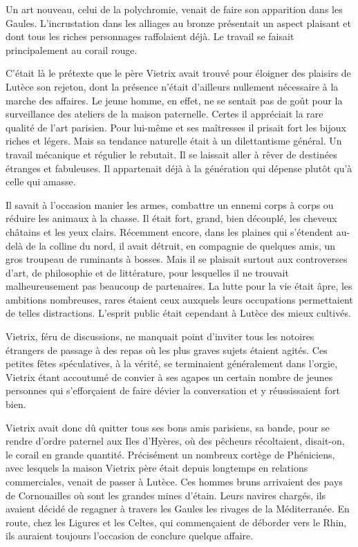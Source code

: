 \documentclass[a4paper, 11pt, oneside, polutonikogreek, french]{article}
\begin{document}
Un art nouveau, celui de la polychromie, venait de faire son apparition dans les Gaules. L'incrustation dans les alliages au bronze présentait un aspect plaisant et dont tous les riches personnages raffolaient déjà. Le travail se faisait principalement au corail rouge.

C'était là le prétexte que le père Vietrix avait trouvé pour éloigner des plaisirs de Lutèce son rejeton, dont la présence n'était d'ailleurs nullement nécessaire à la marche des affaires. Le jeune homme, en effet, ne se sentait pas de goût pour la surveillance des ateliers de la maison paternelle. Certes il appréciait la rare qualité de l'art parisien. Pour lui-même et ses maîtresses il prisait fort les bijoux riches et légers. Mais sa tendance naturelle était à un dilettantisme général. Un travail mécanique et régulier le rebutait. Il se laissait aller à rêver de destinées étranges et fabuleuses. Il appartenait déjà à la génération qui dépense plutôt qu'à celle qui amasse.

Il savait à l'occasion manier les armes, combattre un ennemi corps à corps ou réduire les animaux à la chasse. Il était fort, grand, bien découplé, les cheveux châtains et les yeux clairs. Récemment encore, dans les plaines qui s'étendent au-delà de la colline du nord, il avait détruit, en compagnie de quelques amis, un gros troupeau de ruminants à bosses. Mais il se plaisait surtout aux controverses d'art, de philosophie et de littérature, pour lesquelles il ne trouvait malheureusement pas beaucoup de partenaires. La lutte pour la vie était âpre, les ambitions nombreuses, rares étaient ceux auxquels leurs occupations permettaient de telles distractions. L'esprit public était cependant à Lutèce des mieux cultivés.

Vietrix, féru de discussions, ne manquait point d'inviter tous les notoires étrangers de passage à des repas où les plus graves sujets étaient agités. Ces petites fêtes spéculatives, à la vérité, se terminaient généralement dans l'orgie, Vietrix étant accoutumé de convier à ses agapes un certain nombre de jeunes personnes qui s'efforçaient de faire dévier la conversation et y réussissaient fort bien.

\bigskip
\centerline{\EightStarTaper}
\centerline{\EightStarTaper\EightStarTaper}
\bigskip

Vietrix avait donc dû quitter tous ses bons amis parisiens, sa bande, pour se rendre d'ordre paternel aux Iles d'Hyères, où des pêcheurs récoltaient, disait-on, le corail en grande quantité. Précisément un nombreux cortège de Phéniciens, avec lesquels la maison Vietrix père était depuis longtemps en relations commerciales, venait de passer à Lutèce. Ces hommes bruns arrivaient des pays de Cornouailles où sont les grandes mines d'étain. Leurs navires chargés, ils avaient décidé de regagner à travers les Gaules les rivages de la Méditerranée. En route, chez les Ligures et les Celtes, qui commençaient de déborder vers le Rhin, ils auraient toujours l'occasion de conclure quelque affaire.
\end{document}
